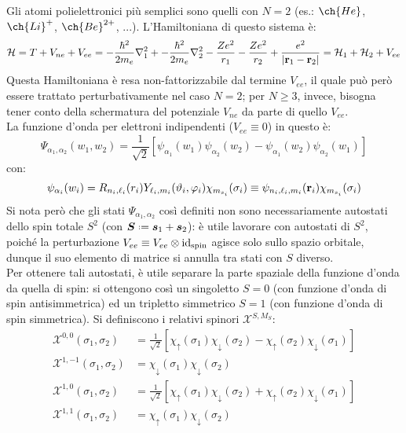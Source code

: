 Gli atomi polielettronici più semplici sono quelli con $ N = 2 $ (es.: $ \ch{He} $, $ \ch{Li}^+ $, $ \ch{Be}^{2+} $, ...). L'Hamiltoniana di questo sistema è:
\begin{equation*}
	\mathcal{H} = T + V_{ne} + V_{ee} = - \frac{\hbar^2}{2m_e} \nabla^2_1 + - \frac{\hbar^2}{2m_e} \nabla^2_2 - \frac{Ze^2}{r_1} - \frac{Ze^2}{r_2} + \frac{e^2}{\left\lvert\mathbf{r}_1 - \mathbf{r}_2\right\rvert} = \mathcal{H}_1 + \mathcal{H}_2 + V_{ee}
\end{equation*}
Questa Hamiltoniana è resa non-fattorizzabile dal termine $ V_{ee} $, il quale può però essere trattato perturbativamente nel caso $ N = 2 $; per $ N \ge 3 $, invece, bisogna tener conto della schermatura del potenziale $ V_{ne} $ da parte di quello $ V_{ee} $. \\
La funzione d'onda per elettroni indipendenti ($ V_{ee} \equiv 0 $) in questo è:
\begin{equation*}
	\Psi_{\alpha_1 , \alpha_2}(w_1 , w_2) = \frac{1}{\sqrt{2}} \left[ \psi_{\alpha_1}(w_1) \psi_{\alpha_2}(w_2) - \psi_{\alpha_1}(w_2) \psi_{\alpha_2}(w_1) \right]
\end{equation*}
con:
\begin{equation*}
	\psi_{\alpha_i}(w_i) = R_{n_i, \ell_i}(r_i) Y_{\ell_i, m_i}(\vartheta_i, \varphi_i) \chi_{m_{s_i}}(\sigma_i) \equiv \psi_{n_i, \ell_i, m_i}(\mathbf{r}_i) \chi_{m_{s_i}}(\sigma_i)
\end{equation*}
Si nota però che gli stati $ \Psi_{\alpha_1, \alpha_2} $ così definiti non sono necessariamente autostati dello spin totale $ S^2 $ (con $ \bs{S} \defeq \bs{s}_1 + \bs{s}_2 $): è utile lavorare con autostati di $ S^2 $, poiché la perturbazione $ V_{ee} \equiv V_{ee} \otimes \operatorname{id}_\text{spin} $ agisce solo sullo spazio orbitale, dunque il suo elemento di matrice si annulla tra stati con $ S $ diverso. \\
Per ottenere tali autostati, è utile separare la parte spaziale della funzione d'onda da quella di spin: si ottengono così un singoletto $ S = 0 $ (con funzione d'onda di spin antisimmetrica) ed un tripletto simmetrico $ S = 1 $ (con funzione d'onda di spin simmetrica). Si definiscono i relativi spinori $ \mathcal{X}^{S,M_S} $:
\begin{align*}
	\mathcal{X}^{0,0}(\sigma_1, \sigma_2) &= \frac{1}{\sqrt{2}} \left[ \chi_\uparrow(\sigma_1) \chi_\downarrow(\sigma_2) - \chi_\uparrow(\sigma_2) \chi_\downarrow(\sigma_1) \right] \\
	\mathcal{X}^{1,-1}(\sigma_1, \sigma_2) &= \chi_\downarrow(\sigma_1) \chi_\downarrow(\sigma_2) \\
	\mathcal{X}^{1,0}(\sigma_1, \sigma_2) &= \frac{1}{\sqrt{2}} \left[ \chi_\uparrow(\sigma_1) \chi_\downarrow(\sigma_2) + \chi_\uparrow(\sigma_2) \chi_\downarrow(\sigma_1) \right] \\
	\mathcal{X}^{1,1}(\sigma_1, \sigma_2) &= \chi_\uparrow(\sigma_1) \chi_\downarrow(\sigma_2)
\end{align*}
